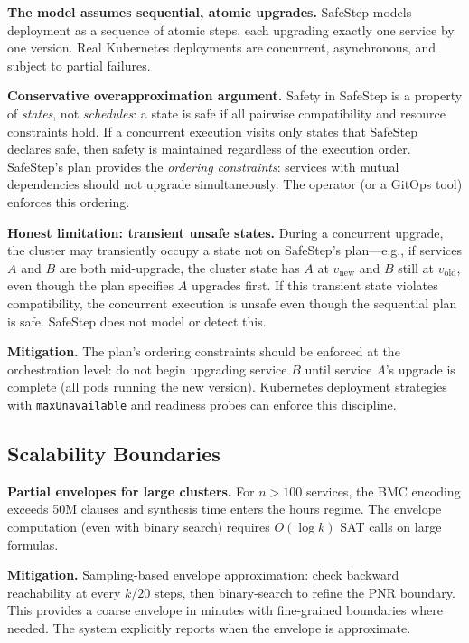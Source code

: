 \documentclass[10pt,twocolumn]{article}
\begin{document}
\textbf{The model assumes sequential, atomic upgrades.} SafeStep models deployment as a sequence of atomic steps, each upgrading exactly one service by one version. Real Kubernetes deployments are concurrent, asynchronous, and subject to partial failures.

\textbf{Conservative overapproximation argument.} Safety in SafeStep is a property of \emph{states}, not \emph{schedules}: a state is safe if all pairwise compatibility and resource constraints hold. If a concurrent execution visits only states that SafeStep declares safe, then safety is maintained regardless of the execution order. SafeStep's plan provides the \emph{ordering constraints}: services with mutual dependencies should not upgrade simultaneously. The operator (or a GitOps tool) enforces this ordering.

\textbf{Honest limitation: transient unsafe states.} During a concurrent upgrade, the cluster may transiently occupy a state not on SafeStep's plan---e.g., if services $A$ and $B$ are both mid-upgrade, the cluster state has $A$ at $v_{\mathrm{new}}$ and $B$ still at $v_{\mathrm{old}}$, even though the plan specifies $A$ upgrades first. If this transient state violates compatibility, the concurrent execution is unsafe even though the sequential plan is safe. SafeStep does not model or detect this.

\textbf{Mitigation.} The plan's ordering constraints should be enforced at the orchestration level: do not begin upgrading service $B$ until service $A$'s upgrade is complete (all pods running the new version). Kubernetes deployment strategies with \texttt{maxUnavailable} and readiness probes can enforce this discipline.

\subsection{Scalability Boundaries}
\label{sec:limit-scale}

\textbf{Partial envelopes for large clusters.} For $n > 100$ services, the BMC encoding exceeds 50M clauses and synthesis time enters the hours regime. The envelope computation (even with binary search) requires $O(\log k)$ SAT calls on large formulas.

\textbf{Mitigation.} Sampling-based envelope approximation: check backward reachability at every $k/20$ steps, then binary-search to refine the PNR boundary. This provides a coarse envelope in minutes with fine-grained boundaries where needed. The system explicitly reports when the envelope is approximate.
\end{document}
